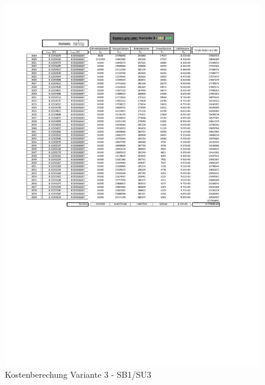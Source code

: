 \begin{figure}[h!]
	\centering
	\includegraphics[width=\textwidth]{figures/Anhang/f-00-A-V3-B1-U3}
	\caption{Kostenberechung Variante 3 - SB1/SU3}
\end{figure}

